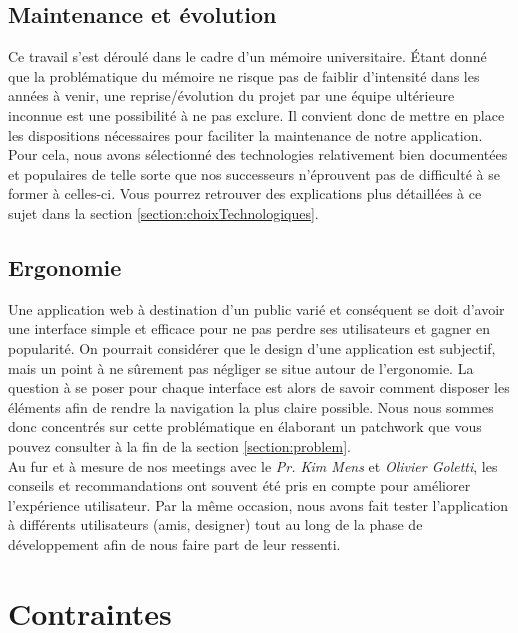 \subsection*{Maintenance et évolution}

Ce travail s'est déroulé dans le cadre d'un mémoire universitaire. Étant donné que la problématique du mémoire ne risque pas de faiblir d'intensité dans les années à venir, une reprise/évolution du projet par une équipe ultérieure inconnue est une possibilité à ne pas exclure. Il convient donc de mettre en place les dispositions nécessaires pour faciliter la maintenance de notre application. \\

Pour cela, nous avons sélectionné des technologies relativement bien documentées et populaires de telle sorte que nos successeurs n'éprouvent pas de difficulté à se former à celles-ci. Vous pourrez retrouver des explications plus détaillées à ce sujet dans la section \ref{section:choixTechnologiques}.

\subsection*{Ergonomie}

Une application web à destination d'un public varié et conséquent se doit d'avoir une interface simple et efficace pour ne pas perdre ses utilisateurs et gagner en popularité. On pourrait considérer que le design d'une application est subjectif, mais un point à ne sûrement pas négliger se situe autour de l'ergonomie. La question à se poser pour chaque interface est alors de savoir comment disposer les éléments afin de rendre la navigation la plus claire possible. Nous nous sommes donc concentrés sur cette problématique en élaborant un patchwork que vous pouvez consulter à la fin de la section \ref{section:problem}.\\

Au fur et à mesure de nos meetings avec le \textit{Pr. Kim Mens} et \textit{Olivier Goletti}, les conseils et recommandations ont souvent été pris en compte pour améliorer l'expérience utilisateur. Par la même occasion, nous avons fait tester l'application à différents utilisateurs (amis, designer) tout au long de la phase de développement afin de nous faire part de leur ressenti.

\pagebreak
\section {Contraintes}
\label{sec:ContraintesCdc}

